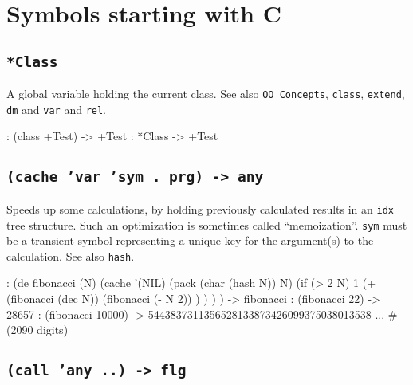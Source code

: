 %
%
%



\chapter{Symbols starting with C}
\label{sec:functions-starting-with-C}

 
\section*{\texttt{*Class}}
\label{sec:funct-rec-C-*class}


A global variable holding the current class. See also \texttt{OO Concepts},
\texttt{class}, \texttt{extend}, \texttt{dm} and \texttt{var} and \texttt{rel}.


\begin{wideverbatim}
: (class +Test)
-> +Test
: *Class
-> +Test
\end{wideverbatim}

 
\section*{\texttt{(cache 'var 'sym . prg) -> any}}
\label{sec:funct-rec-C-(cache-'var-'sym-.-prg)-->-any}


Speeds up some calculations, by holding previously calculated results in
an \texttt{idx} tree structure. Such an optimization is sometimes called
``memoization''. \texttt{sym} must be a transient symbol representing a unique
key for the argument(s) to the calculation. See also \texttt{hash}.


\begin{wideverbatim}
: (de fibonacci (N)
   (cache '(NIL) (pack (char (hash N)) N)
      (if (> 2 N)
         1
         (+
            (fibonacci (dec N))
            (fibonacci (- N 2)) ) ) ) )
-> fibonacci
: (fibonacci 22)
-> 28657
: (fibonacci 10000)
-> 5443837311356528133873426099375038013538 ...  # (2090 digits)
\end{wideverbatim}

 
\section*{\texttt{(call 'any ..) -> flg}}
\label{sec:funct-rec-C-(call-'any-..)-->-flg}


